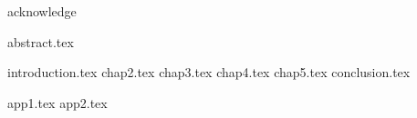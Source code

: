 \documentclass[UTF8, nocolorlinks, openany, spacing, pdftoc, pkuspace]{impthss}
\begin{document}
	\covermatter
 	
 	\null\newpage
 	
 	\null\newpage

	
	
	{acknowledge}
	
	\frontmatter
	{abstract.tex}
	\tableofcontents

	\mainmatter
	{introduction.tex}
	{chap2.tex}
	{chap3.tex}
	{chap4.tex}
	{chap5.tex}
	{conclusion.tex}
	
	\appendix
	\printbibliography[
		heading = bibintoc,
		sorting = ecnty
	]
	{app1.tex}
	{app2.tex}
	
	\backmatter
	
\end{document}
